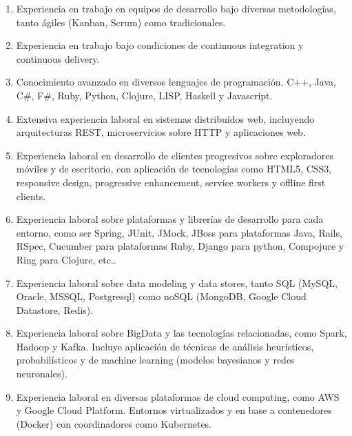 \documentclass[a4paper,11pt]{article}
\begin{document}
\begin{enumerate}

  \item Experiencia en trabajo en equipos de desarrollo bajo diversas
    metodologías, tanto ágiles (Kanban, Scrum) como tradicionales.

  \item Experiencia en trabajo bajo condiciones de continuous integration y
    continuous delivery.

  \item Conocimiento avanzado en diversos lenguajes de programación. C++,
    Java, C\#, F\#, Ruby, Python, Clojure, LISP, Haskell y Javascript.

  \item Extensiva experiencia laboral en sistemas distribuídos web, incluyendo
    arquitecturas REST, microservicios sobre HTTP y aplicaciones web.

  \item Experiencia laboral en desarrollo de clientes progresivos sobre
    exploradores móviles y de escritorio, con aplicación de tecnologías como
    HTML5, CSS3, responsive design, progressive enhancement, service workers y
    offline first clients.

  \item Experiencia laboral sobre plataformas y librerías de desarrollo para
    cada entorno, como ser Spring, JUnit, JMock, JBoss para plataformas Java,
    Rails, RSpec, Cucumber para plataformas Ruby, Django para python, Compojure y Ring para
    Clojure, etc..

  \item Experiencia laboral sobre data modeling y data stores, tanto SQL
    (MySQL, Oracle, MSSQL, Postgresql) como noSQL (MongoDB, Google Cloud
    Datastore, Redis).

  \item Experiencia laboral sobre BigData y las tecnologías relacionadas, como
    Spark, Hadoop y Kafka. Incluye aplicación de técnicas de análisis
    heurísticos, probabilísticos y de machine learning (modelos bayesianos y
    redes neuronales).

  \item Experiencia laboral en diversas plataformas de cloud computing, como
    AWS y Google Cloud Platform. Entornos virtualizados y en base a
      contenedores (Docker) con coordinadores como Kubernetes.

\end{enumerate}
\end{document}
